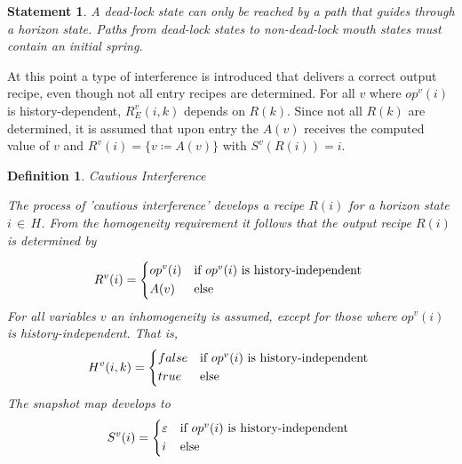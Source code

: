 \documentclass[12pt,a4paper]{scrartcl}
\newtheorem{definition}{Definition}
\newtheorem{statement}{Statement}
\begin{document}
\begin{statement} \label{stm:dead-lock-horizon}
A dead-lock state can only be reached by a path that guides through a horizon
state.  Paths from dead-lock states to non-dead-lock mouth states must contain
an initial spring.  
\end{statement}

At this point a type of interference is introduced that delivers a correct
output recipe, even though not all entry recipes are determined. For all $v$ where 
$op^v(i)$ is history-dependent, $R^v_E(i,k)$ depends on $R(k)$. Since not all 
$R(k)$ are determined, it is assumed that upon entry the $A(v)$ receives the
computed value of $v$ and $R^v(i) = \{ v \coloneqq  A(v) \}$ with $S^v(R(i))=i$.

\begin{definition}
Cautious Interference

The process of 'cautious interference' develops a recipe $R(i)$ for a horizon state
$i\,\in\,H$.  From the homogeneity requirement it follows that the output
recipe $R(i)$ is determined by 
          
\begin{equation} \label{eq:cautious-output-recipe}
    R^v(i) = \begin{dcases*}
              op^v(i) & if $op^v(i)$ is history-independent \\
              A(v)    & else
             \end{dcases*}
\end{equation}
For all variables $v$ an inhomogeneity is assumed, except for those where $op^v(i)$
is history-independent. That is,
\begin{equation} \label{eq:cautious-homogeneity}
    H^v(i,k) = \begin{dcases*}
                     false & if $op^v(i)$ is history-independent \\
                     true  & else
                 \end{dcases*}
\end{equation}
The snapshot map develops to
\begin{equation} \label{eq:cautious-interference-snapshot}
    S^v(i) = \begin{dcases*}
                \varepsilon & if $op^v(i)$ is history-independent \\
                i           & else
             \end{dcases*}
\end{equation}
\end{definition}
\end{document}
